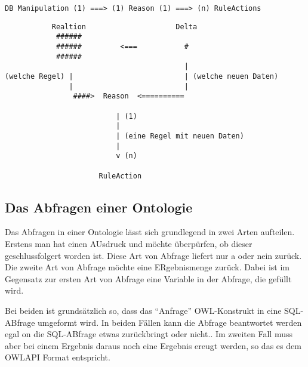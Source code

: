\begin{verbatim}
DB Manipulation (1) ===> (1) Reason (1) ===> (n) RuleActions
\end{verbatim}


\begin{verbatim}
           Realtion                     Delta
            ######
            ######         <===           #
            ######
                                          |
(welche Regel) |                          | (welche neuen Daten)
               |                          |
                ####>  Reason  <==========

                          | (1)
                          |
                          | (eine Regel mit neuen Daten)
                          |
                          v (n)

                      RuleAction
\end{verbatim}


\subsection{Das Abfragen einer Ontologie}
Das Abfragen in einer Ontologie lässt sich grundlegend in zwei Arten aufteilen. Erstens man hat einen AUsdruck und möchte überpürfen, ob dieser geschlussfolgert worden ist. Diese Art von Abfrage liefert nur a oder nein zurück. Die zweite Art von Abfrage möchte eine ERgebnismenge zurück. Dabei ist im Gegensatz zur ersten Art von Abfrage eine Variable in der Abfrage, die gefüllt wird.

Bei beiden ist grundsätzlich so, dass das ``Anfrage'' OWL-Konstrukt in eine SQL-ABfrage umgeformt wird. In beiden Fällen kann die Abfrage beantwortet werden egal on die SQL-ABfrage etwas zurückbringt oder nicht.. Im zweiten Fall muss aber bei einem Ergebnis daraus noch eine Ergebnis ereugt werden, so das es dem OWLAPI Format entspricht.


